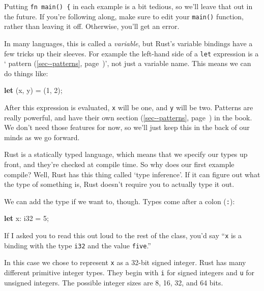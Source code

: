 \documentclass[a4paper,]{book}
\renewcommand*{\hyperref}[2][\ar]{%
  \def\ar{#2}%
  #2 (\autoref{#1}, page~\pageref{#1})}
\newenvironment{Shaded}{\begin{snugshade}}{\end{snugshade}}
\newcommand{\KeywordTok}[1]{\textcolor[rgb]{0.13,0.29,0.53}{\textbf{{#1}}}}
\newcommand{\DataTypeTok}[1]{\textcolor[rgb]{0.13,0.29,0.53}{{#1}}}
\newcommand{\DecValTok}[1]{\textcolor[rgb]{0.00,0.00,0.81}{{#1}}}
\newcommand{\NormalTok}[1]{{#1}}
\begin{document}
Putting \texttt{fn\ main()\ \{} in each example is a bit tedious, so
we'll leave that out in the future. If you're following along, make sure
to edit your \texttt{main()} function, rather than leaving it off.
Otherwise, you'll get an error.

In many languages, this is called a \emph{variable}, but Rust's variable
bindings have a few tricks up their sleeves. For example the left-hand
side of a \texttt{let} expression is a
`\hyperref[sec--patterns]{pattern}', not just a variable name. This
means we can do things like:

\begin{Shaded}
\begin{Highlighting}[]
\KeywordTok{let} \NormalTok{(x, y) = (}\DecValTok{1}\NormalTok{, }\DecValTok{2}\NormalTok{);}
\end{Highlighting}
\end{Shaded}

After this expression is evaluated, \texttt{x} will be one, and
\texttt{y} will be two. Patterns are really powerful, and have
\hyperref[sec--patterns]{their own section} in the book. We don't need
those features for now, so we'll just keep this in the back of our minds
as we go forward.

Rust is a statically typed language, which means that we specify our
types up front, and they're checked at compile time. So why does our
first example compile? Well, Rust has this thing called `type
inference'. If it can figure out what the type of something is, Rust
doesn't require you to actually type it out.

We can add the type if we want to, though. Types come after a colon
(\texttt{:}):

\begin{Shaded}
\begin{Highlighting}[]
\KeywordTok{let} \NormalTok{x: }\DataTypeTok{i32} \NormalTok{= }\DecValTok{5}\NormalTok{;}
\end{Highlighting}
\end{Shaded}

If I asked you to read this out loud to the rest of the class, you'd say
``\texttt{x} is a binding with the type \texttt{i32} and the value
\texttt{five}.''

In this case we chose to represent \texttt{x} as a 32-bit signed
integer. Rust has many different primitive integer types. They begin
with \texttt{i} for signed integers and \texttt{u} for unsigned
integers. The possible integer sizes are 8, 16, 32, and 64 bits.
\end{document}
